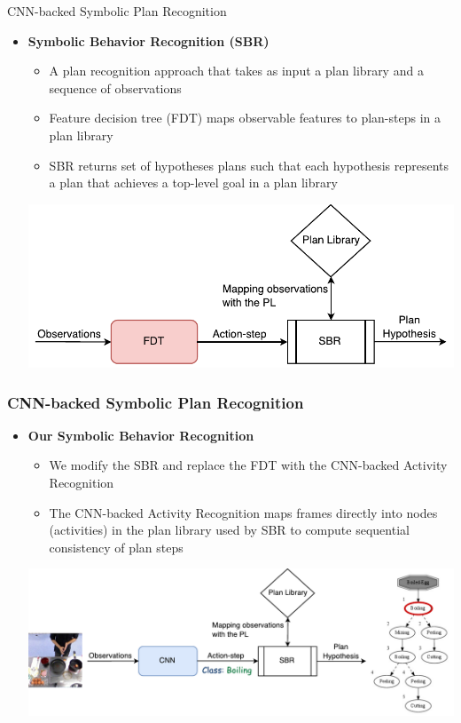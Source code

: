 \documentclass{beamer}
\begin{document}
\begin{frame}{CNN-backed Symbolic Plan Recognition}
   	\begin{itemize}
   		\item \textbf{Symbolic Behavior Recognition (SBR)}
   		\begin{itemize}
				\item A plan recognition approach that takes as input a plan library and a sequence of observations
                \item Feature decision tree (FDT) maps observable features to plan-steps in a plan library
                \item SBR returns set of hypotheses plans such that each hypothesis represents a plan that achieves a top-level goal in a plan library
	    \end{itemize}
		\begin{center}
			\includegraphics[width=0.7\linewidth]{fig/fdt.pdf}
		\end{center}
	\end{itemize}
\end{frame}

\begin{frame}[c]\frametitle{CNN-backed Symbolic Plan Recognition}
   	\begin{itemize}
   		\item \textbf{Our Symbolic Behavior Recognition}
   		\begin{itemize}
				\item We modify the SBR and replace the FDT with the CNN-backed Activity Recognition
                \item The CNN-backed Activity Recognition maps frames directly into nodes (activities) in the plan library used by SBR to compute sequential consistency of plan steps
	    \end{itemize}
		\begin{center}
			\includegraphics[width=0.9\linewidth]{fig/sbr.pdf}
		\end{center}
	\end{itemize}
\end{frame}
\fi
\end{document}
